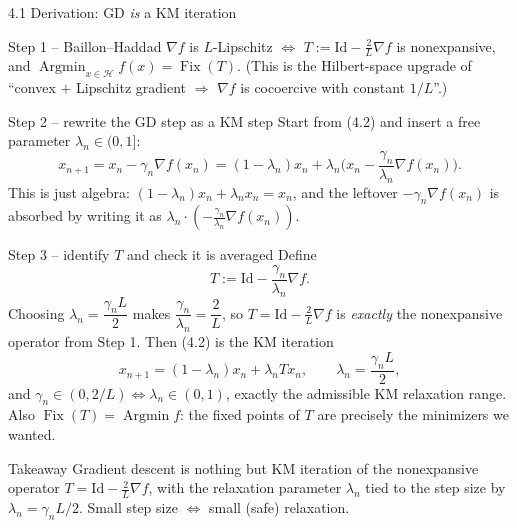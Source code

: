 \documentclass[aspectratio=169,10pt]{beamer}
\newcommand{\Id}{\mathrm{Id}}
\newcommand{\Fix}{\operatorname{Fix}}
\begin{document}
\begin{frame}[allowframebreaks]{4.1 Derivation: GD \emph{is} a KM iteration}
  \begin{block}{Step 1 -- Baillon--Haddad}
    $\nabla f$ is $L$-Lipschitz $\iff$ $T:=\Id-\tfrac2L\nabla f$ is nonexpansive, and $\operatorname*{Argmin}_{x\in\mathcal H} f(x)=\Fix(T)$.
    (This is the Hilbert-space upgrade of ``convex $+$ Lipschitz gradient $\Rightarrow$ $\nabla f$ is cocoercive with constant $1/L$''.)
  \end{block}

  \begin{block}{Step 2 -- rewrite the GD step as a KM step}
    Start from (4.2) and insert a free parameter $\lambda_n\in(0,1]$:
    \[
      x_{n+1} = x_n - \gamma_n\nabla f(x_n)
              = (1-\lambda_n)x_n + \lambda_n\Big(x_n - \frac{\gamma_n}{\lambda_n}\nabla f(x_n)\Big).
    \]
    This is just algebra: $(1-\lambda_n)x_n+\lambda_n x_n = x_n$, and the leftover $-\gamma_n\nabla f(x_n)$ is absorbed by writing it as $\lambda_n\cdot(-\tfrac{\gamma_n}{\lambda_n}\nabla f(x_n))$.
  \end{block}

  \framebreak

  \begin{block}{Step 3 -- identify $T$ and check it is averaged}
    Define
    \[
      T := \Id - \frac{\gamma_n}{\lambda_n}\nabla f.
    \]
    Choosing $\lambda_n = \dfrac{\gamma_n L}{2}$ makes $\dfrac{\gamma_n}{\lambda_n}=\dfrac{2}{L}$, so $T=\Id-\tfrac2L\nabla f$ is \emph{exactly} the nonexpansive operator from Step 1. Then (4.2) is the KM iteration
    \[
      x_{n+1} = (1-\lambda_n)x_n + \lambda_n T x_n, \qquad \lambda_n=\frac{\gamma_n L}{2},
    \]
    and $\gamma_n\in(0,2/L) \iff \lambda_n\in(0,1)$, exactly the admissible KM relaxation range. Also $\Fix(T)=\operatorname*{Argmin} f$: the fixed points of $T$ are precisely the minimizers we wanted.
  \end{block}

  \begin{block}{Takeaway}
    Gradient descent is nothing but KM iteration of the nonexpansive operator $T=\Id-\tfrac2L\nabla f$, with the relaxation parameter $\lambda_n$ tied to the step size by $\lambda_n=\gamma_n L/2$. Small step size $\Leftrightarrow$ small (safe) relaxation.
  \end{block}
\end{frame}
\end{document}
